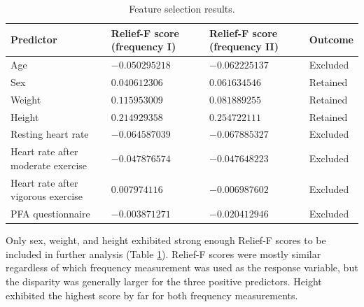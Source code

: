 \documentclass{article}
\begin{document}
\begin{table}[h!]
\centering
	\begin{tabularx}{\linewidth}{@{}XllX@{}}
	\toprule
	Predictor                          & Relief-F score (frequency I) & Relief-F score (frequency II) & Outcome                        \\ \midrule
	Age                                & $-0.050295218$                                       & $-0.062225137$                             & Excluded \\
	Sex                                & $0.040612306$                                        & $0.061634546$                              & Retained                       \\
	Weight                             & $0.115953009$                                        & $0.081889255$                              & Retained                       \\
	Height                             & $0.214929358$                                        & $0.254722111$                              & Retained                       \\
	Resting heart rate                 & $-0.064587039$                                       & $-0.067885327$                             & Excluded \\
	Heart rate after moderate exercise & $-0.047876574$                                       & $-0.047648223$                             & Excluded \\
	Heart rate after vigorous exercise & $0.007974116$                                        & $-0.006987602$                             & Excluded \\
	PFA questionnaire                  & $-0.003871271$                                       & $-0.020412946$                             & Excluded \\ 	\bottomrule
	\end{tabularx}
	\caption{Feature selection results.}
	\label{fig:relief}
\end{table}

Only sex, weight, and height exhibited strong enough Relief-F scores to be included in further analysis (Table \ref{fig:relief}). Relief-F scores were mostly similar regardless of which frequency measurement was used as the response variable, but the disparity was generally larger for the three positive predictors. Height exhibited the highest score by far for both frequency measurements.
\end{document}

